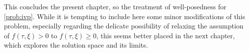 This concludes the present chapter, so the treatment of well-posedness for \autoref{prob:ivp}. While it is tempting to include here some minor modifications of this problem, especially regarding the delicate possibility of relaxing the assumption of $f(\tau,\xi)>0$ to $f(\tau,\xi)\ge0$, this seems better placed in the next chapter, which explores the solution space and its limits.

